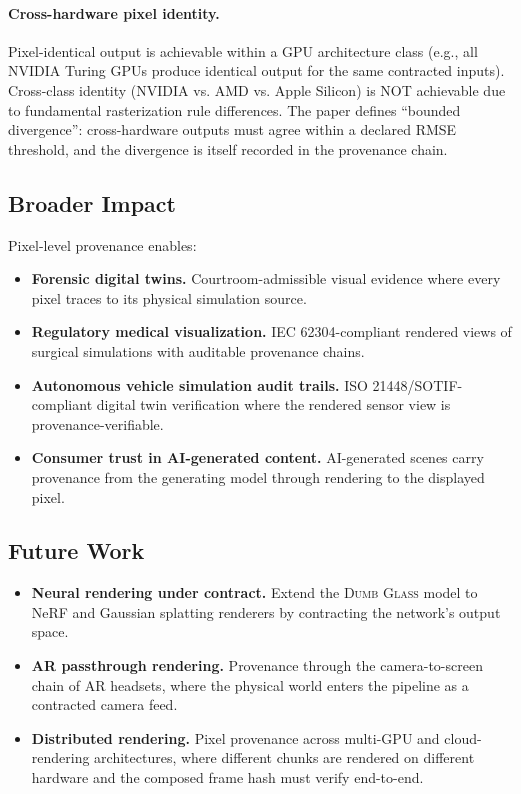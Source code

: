 \documentclass[sigconf,nonacm]{acmart}
\newcommand{\dumbglass}{\textsc{Dumb Glass}}
\begin{document}
\paragraph{Cross-hardware pixel identity.}
Pixel-identical output is achievable within a GPU architecture
class (e.g., all NVIDIA Turing GPUs produce identical output
for the same contracted inputs). Cross-class identity (NVIDIA
vs. AMD vs. Apple Silicon) is NOT achievable due to
fundamental rasterization rule differences. The paper defines
``bounded divergence'': cross-hardware outputs must agree
within a declared RMSE threshold, and the divergence is itself
recorded in the provenance chain.

\subsection{Broader Impact}

Pixel-level provenance enables:
\begin{itemize}
  \item \textbf{Forensic digital twins.} Courtroom-admissible
    visual evidence where every pixel traces to its physical
    simulation source.
  \item \textbf{Regulatory medical visualization.}
    IEC 62304-compliant rendered views of surgical simulations
    with auditable provenance chains.
  \item \textbf{Autonomous vehicle simulation audit trails.}
    ISO 21448/SOTIF-compliant digital twin verification where
    the rendered sensor view is provenance-verifiable.
  \item \textbf{Consumer trust in AI-generated content.}
    AI-generated scenes carry provenance from the generating
    model through rendering to the displayed pixel.
\end{itemize}

\subsection{Future Work}

\begin{itemize}
  \item \textbf{Neural rendering under contract.} Extend the
    \dumbglass{} model to NeRF and Gaussian splatting renderers
    by contracting the network's output space.
  \item \textbf{AR passthrough rendering.} Provenance through
    the camera-to-screen chain of AR headsets, where the
    physical world enters the pipeline as a contracted camera
    feed.
  \item \textbf{Distributed rendering.} Pixel provenance
    across multi-GPU and cloud-rendering architectures, where
    different chunks are rendered on different hardware and
    the composed frame hash must verify end-to-end.
\end{itemize}
\end{document}
